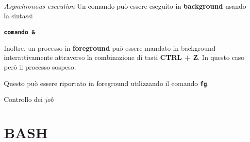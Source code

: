 \documentclass{beamer}
\begin{document}
    \begin{frame}{\textit{Asynchronous execution}}
        Un comando può essere eseguito in \textbf{background} usando la sintassi
        \begin{center}
            \texttt{\textbf{comando \&}}
        \end{center}

        \vspace{0.5cm}

        Inoltre, un processo in \textbf{foreground} può essere mandato
        in background interattivamente attraverso la combinazione di tasti
        \textbf{CTRL + Z}. In questo caso però il processo sospeso.

        \vspace{0.5cm}

        Questo può essere riportato in foreground utilizzando il comando \texttt{\textbf{fg}}.
    \end{frame}

    \begin{frame}{Controllo dei \textit{job}}
    \end{frame}

    \section{BASH}


    
\end{document}
